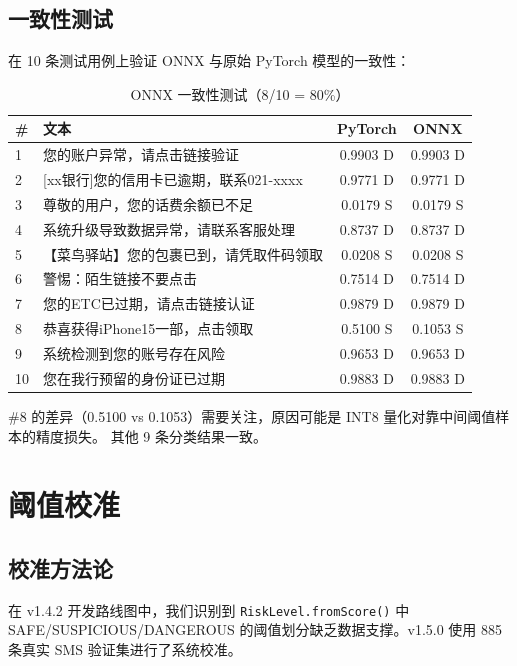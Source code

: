 \documentclass[11pt,a4paper]{article}
\begin{document}
\subsection{一致性测试}

在 10 条测试用例上验证 ONNX 与原始 PyTorch 模型的一致性：

\begin{table}[H]
\centering
\caption{ONNX 一致性测试（8/10 = 80\%）}
\begin{tabular}{llcc}
\toprule
\# & 文本 & PyTorch & ONNX \\
\midrule
1 & 您的账户异常，请点击链接验证 & 0.9903 D & 0.9903 D \\
2 & [xx银行]您的信用卡已逾期，联系021-xxxx & 0.9771 D & 0.9771 D \\
3 & 尊敬的用户，您的话费余额已不足 & 0.0179 S & 0.0179 S \\
4 & 系统升级导致数据异常，请联系客服处理 & 0.8737 D & 0.8737 D \\
5 & 【菜鸟驿站】您的包裹已到，请凭取件码领取 & 0.0208 S & 0.0208 S \\
6 & 警惕：陌生链接不要点击 & 0.7514 D & 0.7514 D \\
7 & 您的ETC已过期，请点击链接认证 & 0.9879 D & 0.9879 D \\
8 & 恭喜获得iPhone15一部，点击领取 & 0.5100 S & 0.1053 S \\
9 & 系统检测到您的账号存在风险 & 0.9653 D & 0.9653 D \\
10 & 您在我行预留的身份证已过期 & 0.9883 D & 0.9883 D \\
\bottomrule
\end{tabular}
\end{table}

\#8 的差异（0.5100 vs 0.1053）需要关注，原因可能是 INT8 量化对靠中间阈值样本的精度损失。
其他 9 条分类结果一致。

\section{阈值校准}

\subsection{校准方法论}

在 v1.4.2 开发路线图中，我们识别到 \texttt{RiskLevel.fromScore()} 中 SAFE/SUSPICIOUS/DANGEROUS
的阈值划分缺乏数据支撑。v1.5.0 使用 885 条真实 SMS 验证集进行了系统校准。
\end{document}
